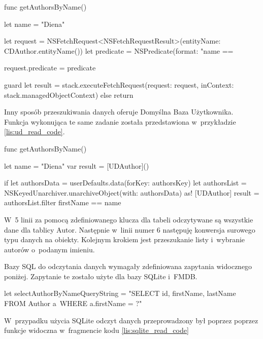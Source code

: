 \begin{code}[
		language=swift,
		caption={Przykład odczytu danych Core Data},
		label={lis:core_data_read_code},
	]
    func getAuthorsByName() {
        let name = "Diena"
        
        let request = NSFetchRequest<NSFetchRequestResult>(entityName: CDAuthor.entityName())
        let predicate = NSPredicate(format: "name == %
        
        request.predicate = predicate
        
        guard let result = stack.executeFetchRequest(request: request, inContext: stack.managedObjectContext) else { return }
    }
\end{code}

Inny sposób przeszukiwania danych oferuje Domyślna Baza Użytkownika. Funkcja wykonująca te same zadanie została przedstawiona w~przykładzie \ref{lis:ud_read_code}.

\begin{code}[
		language=swift,
		caption={Przykład odczytu danych User Defaults},
		label={lis:ud_read_code},
	]
    func getAuthorsByName() {
        let name = "Diena"
        var result = [UDAuthor]()
        
        if  let authorsData = userDefaults.data(forKey: authorsKey) {
            let authorsList = NSKeyedUnarchiver.unarchiveObject(with: authorsData) as! [UDAuthor]
            result = authorsList.filter { firstName == name }
        }
    }
\end{code}


 W~5 linii za pomocą zdefiniowanego klucza dla tabeli odczytywane są wszystkie dane dla tablicy Autor. Następnie w~linii numer 6 następuję konwersja surowego typu danych na obiekty. Kolejnym krokiem jest przeszukanie listy i~wybranie autorów o~podanym imieniu. 

Bazy SQL do odczytania danych wymagały zdefiniowana zapytania widocznego poniżej. Zapytanie te zostało użyte dla bazy SQLite i~FMDB.

\begin{code}[
		language=swift,
		caption={Zapytanie SQL do odczytu danych},
		label={lis:sql_read_query_code},
	]
let selectAuthorByNameQueryString = "SELECT id, firstName, lastName FROM Author a~WHERE a.firstName = ?"
\end{code}

 W~przypadku użycia SQLite odczyt danych przeprowadzony był poprzez poprzez funkcje widoczna w~fragmencie kodu \ref{lis:sqlite_read_code}


